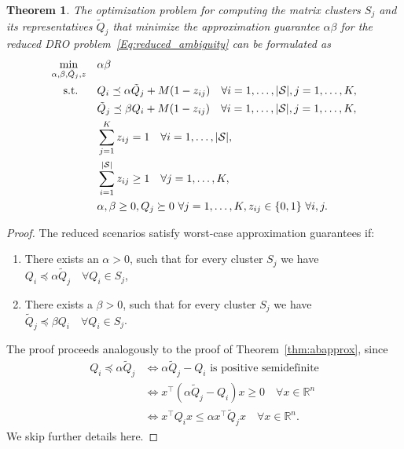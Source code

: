 \documentclass{article}
\newtheorem{theorem}{Theorem}[section]
\newcommand{\mS}{\mathcal{S}}
\newcommand{\R}{\mathbb{R}}
\begin{document}
\begin{theorem}
	The optimization problem for computing the matrix clusters $S_j$ and its representatives $\tilde{Q}_j$ that minimize the approximation guarantee \(\alpha\beta\) for the reduced DRO problem~\eqref{Eq:reduced_ambiguity} can be formulated as
	\begin{equation*}
		\begin{aligned}
			\min_{\alpha, \beta,\tilde{Q}_j,z} \quad & \alpha\beta \\
			\text{ s.t. } \hspace{0.45cm} &  Q_i \preceq  \alpha \tilde{Q}_j + M(1-z_{ij})\quad \forall i=1,\ldots,|\mS|, j=1,\ldots,K, 
			\\
			& \tilde{Q}_j \preceq \beta Q_i + M(1-z_{ij}) \quad \forall i=1,\ldots,|\mS|, j=1,\ldots,K, 	
			\\
			&\sum_{j=1}^{K} z_{ij} = 1 \quad \forall i=1,\ldots,|\mS|, 
			\\
			& \sum_{i=1}^{|\mS|}z_{ij} \geq 1 \quad \forall j=1,\ldots,K,
			\\
			& \alpha,\beta\geq 0,Q_j\succeq 0 \text{ }\forall j=1,\ldots,K,  z_{ij} \in \{0,1\}\text{ } \forall i,j.
		\end{aligned}
	\end{equation*}
\end{theorem}
\begin{proof}%
The reduced scenarios satisfy worst-case approximation guarantees if:
\begin{enumerate}
	\item There exists an \(\alpha>0\), such that for every cluster \(S_j\) we have \(Q_i  \preceq \alpha \tilde{Q}_j \quad \forall Q_i\in S_j\),
	\item There exists a \(\beta>0\), such that for every cluster \(S_j\) we have \(\tilde{Q}_j \preceq \beta Q_i\quad \forall Q_i \in S_j\).
\end{enumerate}
The proof proceeds analogously to the proof of Theorem~\ref{thm:abapprox}, since
\begin{align*}
	Q_i  \preceq \alpha \tilde{Q}_j &\Leftrightarrow  \alpha \tilde{Q}_j -  Q_i  \text{ is positive semidefinite}
	\\
	&\Leftrightarrow	x^\top (\alpha \tilde{Q}_j -  Q_i) x \geq 0 \quad \forall x\in \R^n 	
	\\
	&\Leftrightarrow	x^\top Q_i x \leq \alpha x^\top \tilde{Q}_j x  \quad \forall x\in \R^n.
\end{align*}
We skip further details here.
\end{proof}
\end{document}
